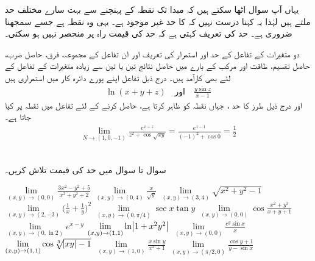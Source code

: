 یہاں آپ سوال اٹھا سکتے ہیں کہ مبدا تک نقطہ  کے پہنچنے سے بہت سارے مختلف حد ملتے ہیں لہٰذا یہ کہنا درست نہیں کہ  کا حد غیر موجود ہے۔ یہی وہ نقطہ ہے جسے سمجھنا ضروری ہے۔ حد کی تعریف  کہتی ہے کہ حد کی قیمت راہ پر منحصر نہیں ہو سکتی۔

دو متغیرات کے تفاعل  کے حد اور استمرار کی تعریف  اور ان  تفاعل کے مجموعہ،  فرق، حاصل ضرب، حاصل تقسیم، طاقت اور مرکب کے بارے میں حاصل نتائج  تین یا تین سے زیادہ متغیرات کے تفاعل کے لئے بھی کارآمد  ہیں۔ درج ذیل تفاعل اپنے پورے دائرہ کار میں استمراری ہیں
\begin{align*}
\ln(x+y+z)\quad \text{اور}\quad \frac{y\sin z}{x-1}
\end{align*} 
اور  درج ذیل طرز کا حد ، جہاں  نقطہ  کو ظاہر کرتا ہے،   حاصل کرنے کے لئے  تفاعل میں نقطہ پر  کیا جاتا ہے۔
\begin{align*}
\lim_{N\to(1,0,-1)}\frac{e^{x+z}}{z^2+\cos\sqrt{xy}}=\frac{e^{1-1}}{(-1)^2+\cos 0}=\frac{1}{2}
\end{align*}

\\
سوال  تا سوال  میں حد کی قیمت تلاش کریں۔

$\lim\limits_{(x,y)\to(0,0)}\frac{3x^2-y^2+5}{x^2+y^2+2}$
$\lim\limits_{(x,y)\to(0,4)}\frac{x}{\sqrt{y}}$
$\lim\limits_{(x,y)\to(3,4)}\sqrt{x^2+y^2-1}$
$\lim\limits_{(x,y)\to(2,-3)}\big(\frac{1}{x}+\frac{1}{y}\big)^2$
$\lim\limits_{(x,y)\to(0,\pi/4)}\sec x\tan y$
$\lim\limits_{(x,y)\to(0,0)}\cos\frac{x^2+y^3}{x+y+1}$
$\lim\limits_{(x,y)\to(0,\ln 2)}e^{x-y}$
$\lim\limits_{(x,y)\to(1,1)}\ln\abs{1+x^2y^2}$
$\lim\limits_{(x,y)\to(0,0)} \frac{e^y\sin x}{x}$
$\lim\limits_{(x,y)\to(1,1)}\cos\sqrt[3]{\abs{xy}-1}$
$\lim\limits_{(x,y)\to(1,0)}\frac{x\sin y}{x^2+1}$
$\lim\limits_{(x,y)\to(\pi/2,0)}\frac{\cos y+1}{y-\sin x}$

